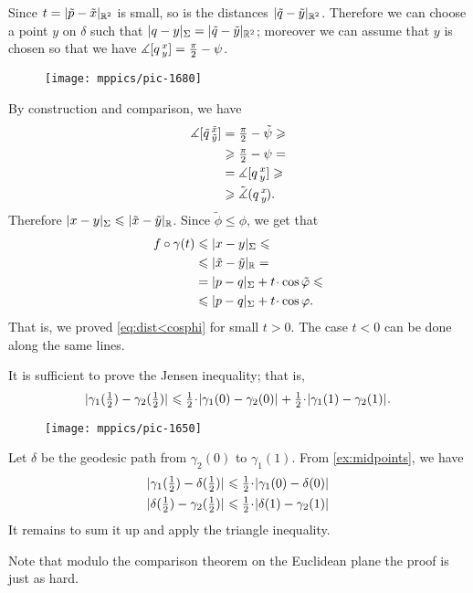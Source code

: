 Since $t=|\tilde p-\tilde x|_{\mathbb{R}^2}$ is small, so is the distances $|\tilde q-\tilde y|_{\mathbb{R}^2}$.
Therefore we can choose a point $y$ on $\delta$ such that $|q-y|_\Sigma=|\tilde q-\tilde y|_{\mathbb{R}^2}$;
moreover we can assume that $y$ is chosen so that we have $\measuredangle[q\,{}^{x}_{y}]= \tfrac\pi2-\psi$.

{

\begin{wrapfigure}[12]{r}{27 mm}
\vskip-0mm
\centering
\texttt{[image: mppics/pic-1680]}
\vskip8mm
\end{wrapfigure}

By construction and comparison, we have 
\begin{align*}
\measuredangle[\tilde q\,{}^{\tilde x}_{\tilde y}]&=\tfrac\pi2-\tilde\psi
\geqslant
\\
&\geqslant
\tfrac\pi2-\psi
=
\\
&=
\measuredangle[q\,{}^{x}_{y}]
\geqslant 
\\
&\geqslant \tilde\measuredangle(q\,{}^{x}_{y}\hspace{-0.2ex}).
\end{align*}
Therefore $|x-y|_\Sigma\leqslant |\tilde x-\tilde y|_{\mathbb{R}}$.
Since $\tilde\phi\le\phi$, we get that
\begin{align*}
f\circ\gamma(t)&\le |x-y|_\Sigma\le 
\\
&\le|\tilde x-\tilde y|_{\RR}=
\\
&=|p-q|_\Sigma+t\cdot\cos\tilde\phi
\le
\\
&\le|p-q|_\Sigma+t\cdot\cos\phi.
\end{align*}
That is, we proved \ref{eq:dist<cosphi} for small $t>0$.
The case $t<0$ can be done along the same lines. 

It is sufficient to prove the Jensen inequality;
that is, 
\[
\dist{\gamma_1(\tfrac12)}{\gamma_2(\tfrac12)}{}
\le
\tfrac12\cdot\dist{\gamma_1(0)}{\gamma_2(0)}{}
+
\tfrac12\cdot \dist{\gamma_1(1)}{\gamma_2(1)}{}.
\]

}

{

\begin{wrapfigure}{o}{46 mm}
\vskip-0mm
\centering
\texttt{[image: mppics/pic-1650]}
\end{wrapfigure}

Let $\delta$ be the geodesic path from $\gamma_2(0)$ to $\gamma_1(1)$.
From \ref{ex:midpoints}, we have
\begin{align*}
\dist{\gamma_1(\tfrac12)}{\delta(\tfrac12)}{}
&\le
\tfrac12\cdot\dist{\gamma_1(0)}{\delta(0)}{}
\\
\dist{\delta(\tfrac12)}{\gamma_2(\tfrac12)}{}
&\le
\tfrac12\cdot\dist{\delta(1)}{\gamma_2(1)}{}
\end{align*}
It remains to sum it up and apply the triangle inequality.

 Note that modulo the comparison theorem 
on the Euclidean plane the proof is just as hard.

}

